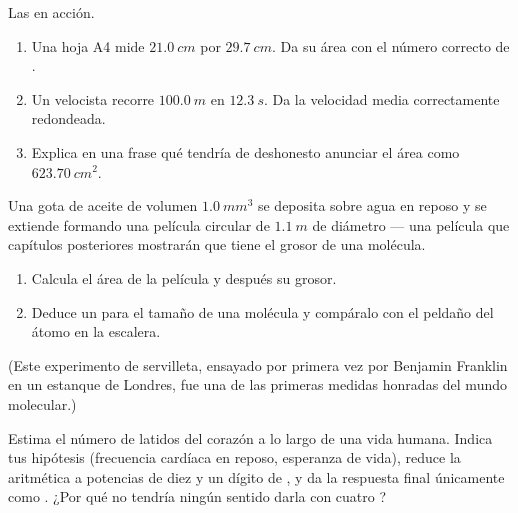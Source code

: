 \begin{exercise}[$\star\star$]\label{exo:g10:orders-of-magnitude:11}
Las  en acción.
\begin{enumerate}
  \item Una hoja A4 mide $\qty{21.0}{cm}$ por $\qty{29.7}{cm}$. Da su
        área con el número correcto de .
  \item Un velocista recorre $\qty{100.0}{m}$ en $\qty{12.3}{s}$. Da la
        velocidad media correctamente redondeada.
  \item Explica en una frase qué tendría de deshonesto anunciar el área
        como $\qty{623.70}{cm^2}$.
\end{enumerate}
\end{exercise}

\begin{exercise}[$\star\star\star$]\label{exo:g10:orders-of-magnitude:12}
Una gota de aceite de volumen $\qty{1.0}{mm^3}$ se deposita sobre agua
en reposo y se extiende formando una película circular de
$\qty{1.1}{m}$ de diámetro --- una película que capítulos posteriores
mostrarán que tiene el grosor de una molécula.
\begin{enumerate}
  \item Calcula el área de la película y después su grosor.
  \item Deduce un  para el tamaño de una molécula y
        compáralo con el peldaño del átomo en la escalera.
\end{enumerate}
(Este experimento de servilleta, ensayado por primera vez por Benjamin
Franklin en un estanque de Londres, fue una de las primeras medidas
honradas del mundo molecular.)
\end{exercise}

\begin{exercise}[$\star\star\star$]\label{exo:g10:orders-of-magnitude:13}
Estima el número de latidos del corazón a lo largo de una vida humana.
Indica tus hipótesis (frecuencia cardíaca en reposo, esperanza de vida),
reduce la aritmética a potencias de diez y un dígito de , y da la
respuesta final únicamente como . ¿Por qué no tendría
ningún sentido darla con cuatro ?
\end{exercise}

